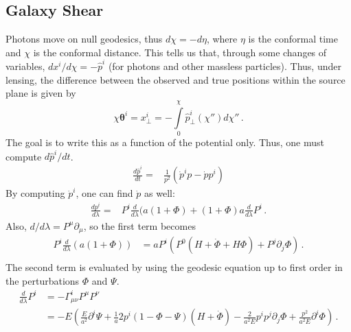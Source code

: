 \subsection{Galaxy Shear}
Photons move on null geodesics, thus $d\chi = -d\eta$, where $\eta$ is the conformal time and $\chi$ is the conformal distance. This tells us that, through some changes of variables, $dx^i/d\chi = -\hat{p}^i$ (for photons and other massless particles). Thus, under lensing, the difference between the observed and true positions within the source plane is given by
\begin{equation}
	\chi\mathbf{\theta}^i = x_\perp^i = -\int\limits_0^\chi \hat{p}^i_\perp(\chi'') d\chi''\,.
\end{equation}
The goal is to write this as a function of the potential only. Thus, one must compute $d\hat{p}^i/dt$.
\begin{equation}\label{eq:dp-hat-dt}
	\begin{split}
		\frac{d\hat{p}^i}{dt} %
		=& \frac{1}{p^2}(\dot{p}^i p - \dot{p}p^i)
	\end{split}
\end{equation}
By computing $\dot p^i$, one can find $\dot p$ as well:
\begin{equation}
	\begin{split}
		\frac{dp^i}{d\lambda} %
		=& P^i\frac{d}{d\lambda}(a(1+\Phi)+(1+\Phi)a\frac{d}{d\lambda}P^i\,.
	\end{split}
\end{equation}
Also, $d/d\lambda = P^\mu \partial_\mu$, so the first term becomes
\begin{equation}
	\begin{split}
		P^i\frac{d}{d\lambda}(a(1+\Phi)) %
		&= a P^i (P^0(H+\dot\Phi +H\Phi) + P^j\partial_j\Phi)\,. \\
	\end{split}
\end{equation}
The second term is evaluated by using the geodesic equation up to first order in the perturbations $\Phi$ and $\Psi$.
\begin{equation}
	\begin{split}
		\frac{d}{d\lambda}P^i &= -\Gamma^i_{\mu\nu}P^\mu P^\nu \\
		&= -E\left( \frac{E}{a^2} \partial^i\Psi + \frac{1}{a}2p^i(1-\Phi-\Psi)(H+\dot\Phi) - \frac{2}{a^2E}p^ip^j\partial_j\Phi + \frac{p^2}{a^2E} \partial^i\Phi \right)\,.
	\end{split}
\end{equation}

